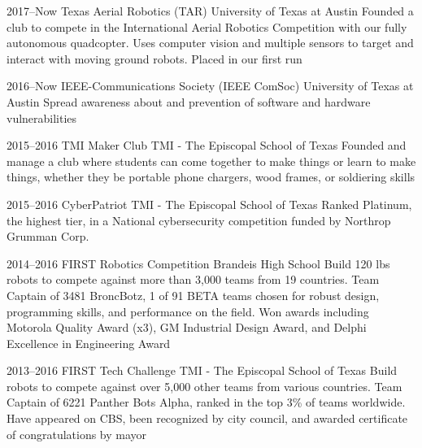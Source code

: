 \documentclass[]{friggeri-cv} %
\begin{document}
\begin{entrylist}

	\entry
	{2017--Now}
	{Texas Aerial Robotics (TAR)}
	{University of Texas at Austin}
	{Founded a club to compete in the International Aerial Robotics Competition with our fully autonomous quadcopter. Uses computer vision and multiple sensors to target and interact with moving ground robots. Placed  in our first run}


	\entry
	{2016--Now}
	{IEEE-Communications Society (IEEE ComSoc)}
	{University of Texas at Austin}
	{Spread awareness about and prevention of software and hardware vulnerabilities}


	\entry
	{2015--2016}
	{TMI Maker Club}
	{TMI - The Episcopal School of Texas}
	{Founded and manage a club where students can come together to make things or learn to make things, whether they be portable phone chargers, wood frames, or soldiering skills}


	\entry
	{2015--2016}
	{CyberPatriot}
	{TMI - The Episcopal School of Texas}
	{Ranked Platinum, the highest tier, in a National cybersecurity competition funded by Northrop Grumman Corp.}


	\entry
	{2014--2016}
	{FIRST Robotics Competition}
	{Brandeis High School}
	{Build 120 lbs robots to compete against more than 3,000 teams from 19 countries. Team Captain of 3481 BroncBotz, 1 of 91 BETA teams chosen for robust design, programming skills, and performance on the field. Won awards including Motorola Quality Award (x3), GM Industrial Design Award, and Delphi Excellence in Engineering Award}


	\entry
	{2013--2016}
	{FIRST Tech Challenge}
	{TMI - The Episcopal School of Texas}
	{Build robots to compete against over 5,000 other teams from various countries. Team Captain of 6221 Panther Bots Alpha, ranked in the top 3\% of teams worldwide. Have appeared on CBS, been recognized by city council, and awarded certificate of congratulations by mayor}

\end{entrylist}
\end{document}
